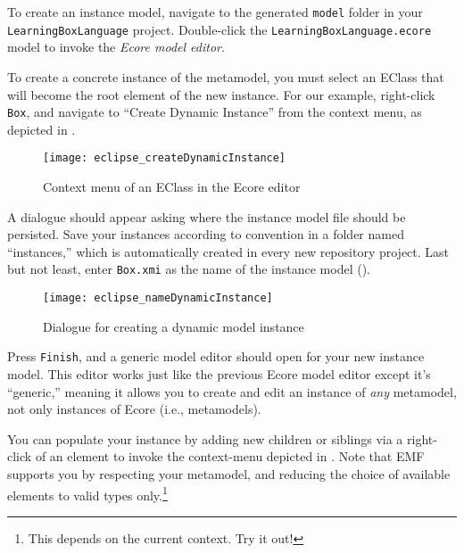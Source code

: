 \begin{stepbystep}

\item To create an instance model, navigate to the generated \texttt{model} folder in your \texttt{LearningBoxLanguage} project.
Double-click the \texttt{LearningBoxLa\-nguage.ecore} model to invoke  the \emph{Ecore model editor}. 

\vspace{0.5cm}

\item To create a concrete instance of the metamodel, you must select an EClass that will become the root element of the new instance.
For our example, right-click \texttt{Box}, and navigate to ``Create Dynamic Instance'' from the context menu, as depicted in .

\begin{figure}[htbp]
	\centering
  \texttt{[image: eclipse\_createDynamicInstance]}
	\caption{Context menu of an EClass in the Ecore editor}
	\label{fig:context_menu}
\end{figure}

\vspace{0.5cm}

\item A dialogue should appear asking where the instance model file should be persisted. Save your instances according to convention in a
folder named ``instances,'' which is automatically created in every new repository project. Last but not least, enter \texttt{Box.xmi} as the name of the
instance model ().

\vspace{0.5cm}

\begin{figure}[htbp]
	\centering
  \texttt{[image: eclipse\_nameDynamicInstance]}
	\caption{Dialogue for creating a dynamic model instance}
	\label{eclipse:store_dynamic_instance}
\end{figure}

\item Press \texttt{Finish}, and a generic model editor should open for your new instance model. This editor works just like the
previous Ecore model editor except it's ``generic,'' meaning it allows you to create and edit an instance of \emph{any} metamodel, not only instances of Ecore
(i.e., metamodels).

\clearpage

\item You can populate your instance by adding new children or siblings via a right-click of an element to invoke the
context-menu depicted in . Note that EMF supports you by respecting your metamodel, and reducing the choice of available
elements to valid types only.\footnote{This depends on the current context. Try it out!}


\end{stepbystep}

